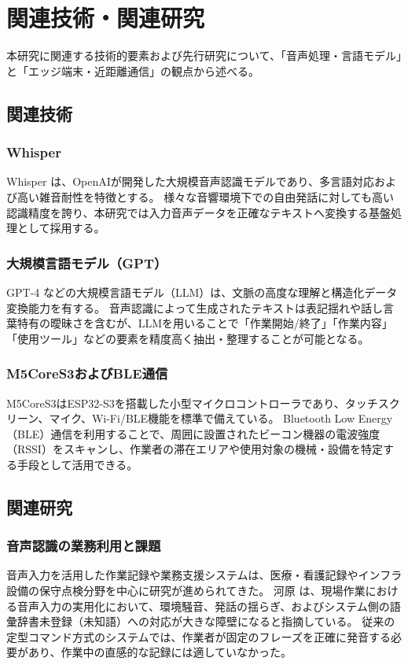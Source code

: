\documentclass[a4paper,12pt,ja=standard,lualatex]{bxjsarticle}
\begin{document}
\newpage

\section{関連技術・関連研究}\label{sec2}
本研究に関連する技術的要素および先行研究について、「音声処理・言語モデル」と「エッジ端末・近距離通信」の観点から述べる。

\subsection{関連技術}
\subsubsection{Whisper}
Whisper \cite{radford2023whisper} は、OpenAIが開発した大規模音声認識モデルであり、多言語対応および高い雑音耐性を特徴とする。
様々な音響環境下での自由発話に対しても高い認識精度を誇り、本研究では入力音声データを正確なテキストへ変換する基盤処理として採用する。

\subsubsection{大規模言語モデル（GPT）}
GPT-4 \cite{openai2023gpt4} などの大規模言語モデル（LLM）は、文脈の高度な理解と構造化データ変換能力を有する。
音声認識によって生成されたテキストは表記揺れや話し言葉特有の曖昧さを含むが、LLMを用いることで「作業開始/終了」「作業内容」「使用ツール」などの要素を精度高く抽出・整理することが可能となる。

\subsubsection{M5CoreS3およびBLE通信}
M5CoreS3はESP32-S3を搭載した小型マイクロコントローラであり、タッチスクリーン、マイク、Wi-Fi/BLE機能を標準で備えている。
Bluetooth Low Energy（BLE）通信を利用することで、周囲に設置されたビーコン機器の電波強度（RSSI）をスキャンし、作業者の滞在エリアや使用対象の機械・設備を特定する手段として活用できる。

\subsection{関連研究}
\subsubsection{音声認識の業務利用と課題}
音声入力を活用した作業記録や業務支援システムは、医療・看護記録やインフラ設備の保守点検分野を中心に研究が進められてきた。
河原 \cite{kawahara2016} は、現場作業における音声入力の実用化において、環境騒音、発話の揺らぎ、およびシステム側の語彙辞書未登録（未知語）への対応が大きな障壁になると指摘している。
従来の定型コマンド方式のシステムでは、作業者が固定のフレーズを正確に発音する必要があり、作業中の直感的な記録には適していなかった。
\end{document}
